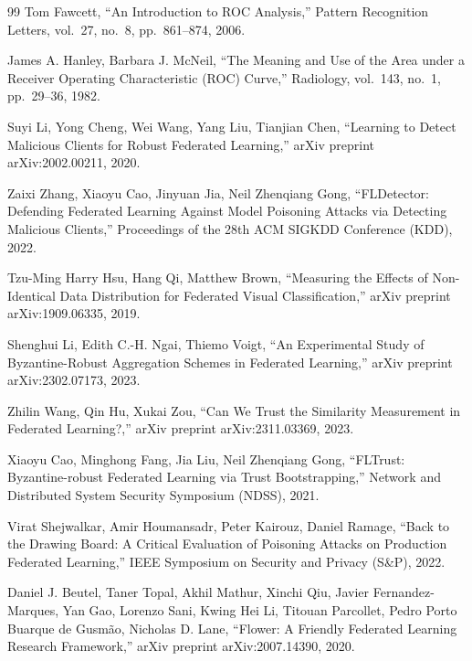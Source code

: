 \documentclass[a4j, twocolumn, dvipdfmx]{jsarticle}
\begin{document}
\begin{thebibliography}{99}
Tom Fawcett,
``An Introduction to ROC Analysis,''
Pattern Recognition Letters, vol.~27, no.~8, pp.~861--874, 2006.

James A. Hanley, Barbara J. McNeil,
``The Meaning and Use of the Area under a Receiver Operating Characteristic (ROC) Curve,''
Radiology, vol.~143, no.~1, pp.~29--36, 1982.

Suyi Li, Yong Cheng, Wei Wang, Yang Liu, Tianjian Chen,
``Learning to Detect Malicious Clients for Robust Federated Learning,''
arXiv preprint arXiv:2002.00211, 2020.

Zaixi Zhang, Xiaoyu Cao, Jinyuan Jia, Neil Zhenqiang Gong,
``FLDetector: Defending Federated Learning Against Model Poisoning Attacks via Detecting Malicious Clients,''
Proceedings of the 28th ACM SIGKDD Conference (KDD), 2022.

Tzu-Ming Harry Hsu, Hang Qi, Matthew Brown,
``Measuring the Effects of Non-Identical Data Distribution for Federated Visual Classification,''
arXiv preprint arXiv:1909.06335, 2019.

Shenghui Li, Edith C.-H. Ngai, Thiemo Voigt,
``An Experimental Study of Byzantine-Robust Aggregation Schemes in Federated Learning,''
arXiv preprint arXiv:2302.07173, 2023.

Zhilin Wang, Qin Hu, Xukai Zou,
``Can We Trust the Similarity Measurement in Federated Learning?,''
arXiv preprint arXiv:2311.03369, 2023.

Xiaoyu Cao, Minghong Fang, Jia Liu, Neil Zhenqiang Gong,
``FLTrust: Byzantine-robust Federated Learning via Trust Bootstrapping,''
Network and Distributed System Security Symposium (NDSS), 2021.

Virat Shejwalkar, Amir Houmansadr, Peter Kairouz, Daniel Ramage,
``Back to the Drawing Board: A Critical Evaluation of Poisoning Attacks on Production Federated Learning,''
IEEE Symposium on Security and Privacy (S\&P), 2022.

Daniel J. Beutel, Taner Topal, Akhil Mathur, Xinchi Qiu, Javier Fernandez-Marques, Yan Gao, Lorenzo Sani, Kwing Hei Li, Titouan Parcollet, Pedro Porto Buarque de Gusm\~{a}o, Nicholas D. Lane,
``Flower: A Friendly Federated Learning Research Framework,''
arXiv preprint arXiv:2007.14390, 2020.

\end{thebibliography}
\end{document}
